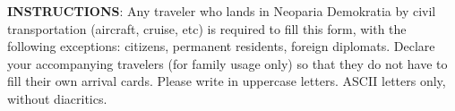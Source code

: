 




\begin{minipage}{\textwidth}
	\small
	\textbf{INSTRUCTIONS}:
	\inlinelistitem Any traveler who lands in Neoparia Demokratia by civil transportation (aircraft, cruise, etc) is required to fill this form, with the following exceptions: citizens, permanent residents, foreign diplomats.
    \inlinelistitem Declare your accompanying travelers (for family usage only) so that they do not have to fill their own arrival cards.
    \inlinelistitem Please write in uppercase letters. ASCII letters only, without diacritics.
\end{minipage}
\vskip 20pt



